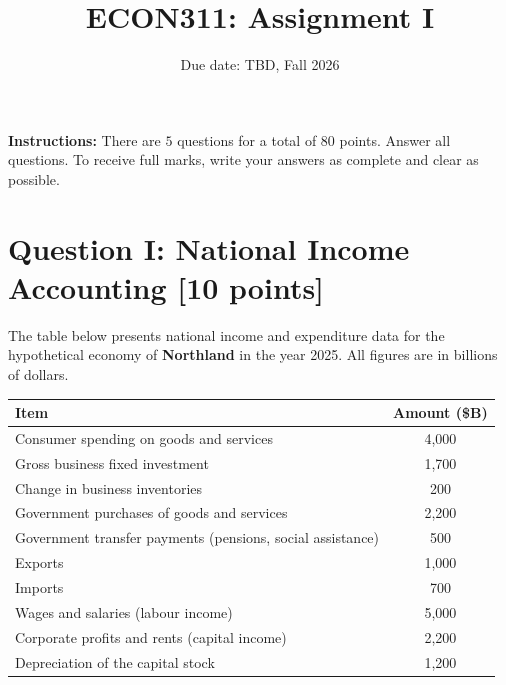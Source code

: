 \documentclass[letterpaper,12pt]{article}
\title{ECON311: Assignment I}
\author{}
\date{Due date: TBD, Fall 2026}
\theoremstyle{dotlessS}
\begin{document}
\maketitle
\vspace{-.3in}
\textbf{Instructions:} There are $5$ questions for a total of $80$ points. Answer all questions. To receive full marks, write your answers as complete and clear as possible.

\section*{Question I: National Income Accounting [10 points]}
The table below presents national income and expenditure data for the hypothetical economy of \textbf{Northland} in the year 2025. All figures are in billions of dollars.

\vspace{0.3em}
\begin{table}[H]
\centering
\begin{tabular}{lc}
\toprule
\textbf{Item} & \textbf{Amount (\$B)} \\
\midrule
Consumer spending on goods and services & 4{,}000 \\
Gross business fixed investment & 1{,}700 \\
Change in business inventories & 200 \\
Government purchases of goods and services & 2{,}200 \\
Government transfer payments (pensions, social assistance) & 500 \\
Exports & 1{,}000 \\
Imports & 700 \\
\midrule
Wages and salaries (labour income) & 5{,}000 \\
Corporate profits and rents (capital income) & 2{,}200 \\
Depreciation of the capital stock & 1{,}200 \\
\bottomrule
\end{tabular}
\end{table}
\end{document}
